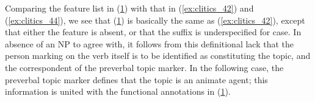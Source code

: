 \begin{figure}[h]
\begin{morphlex}
\ex\label{ex:clitics_45}
\xe
\end{morphlex}
\end{figure}

Comparing the feature list in (\ref{ex:clitics_45}) with that in
(\ref{ex:clitics_42}) and (\ref{ex:clitics_44}), we see that
(\ref{ex:clitics_45}) is basically the same as (\ref{ex:clitics_42}), except
that either the \Case{} feature is absent, or that the suffix is
underspecified for case. In absence of an NP to agree with, it follows from
this definitional lack that the person marking on the verb itself is to be
identified as constituting the topic, and the correspondent of the preverbal
topic marker. In the following case, the preverbal topic marker defines that
the topic is an animate agent; this information is united with the functional
annotations in (\ref{ex:clitics_45}).

\begin{figure}[h]
\begin{morphlex}
\ex\label{ex:clitics_46}
\xe
\end{morphlex}
\end{figure}

